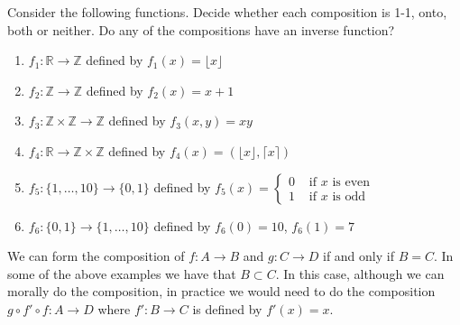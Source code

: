 \documentclass[11pt,dvipsnames]{book}
\def\R{\mathbb{R}}
\def\Z{\mathbb{Z}}
\numberwithin{figure}{section} %
\numberwithin{table}{section} %
\begin{document}
\begin{exercise}
 Consider the following functions. Decide whether each composition is 1-1, onto, both or neither. Do any of the compositions have an inverse function?

\begin{enumerate}[label=(\alph*)]
\item $f_1 \colon \R \to \Z$ defined by $f_1(x) = \lfloor x \rfloor$
\item $f_2 \colon \Z \to \Z$ defined by $f_2(x) = x+1$
\item $f_3 \colon \Z \times \Z \to \Z$ defined by $f_3(x,y) = xy$
\item $f_4 \colon \R \to \Z \times \Z$ defined by $f_4(x) = (\lfloor x \rfloor, \lceil x \rceil)$
\item $f_5 \colon \{ 1,\dots,10\} \to \{0,1\}$ defined by $f_5(x) = \begin{cases} 0 & \text{ if }x \text{ is even} \\1 & \text{ if }x \text{ is odd} \end{cases}$
\item $f_6 \colon \{0,1\} \to \{ 1,\dots,10\}$ defined by $f_6(0) = 10$, $f_6(1) = 7$
\end{enumerate}

\begin{solution}
We can form the composition of $f \colon A \to B$ and $g \colon C \to D$ if and only if $B=C$. In some of the above examples we have that $B \subset C$. In this case, although we can morally do the composition, in practice we would need to do the composition $g \circ f' \circ f \colon A \to D$ where $f' \colon B \to C$ is defined by $f'(x)=x$.


\end{solution}
\end{exercise}
\end{document}
